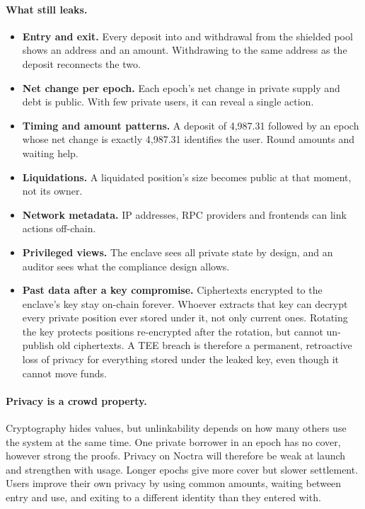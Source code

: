 \documentclass[11pt,a4paper]{article}
\begin{document}
\paragraph{What still leaks.}
\begin{itemize}
  \item \textbf{Entry and exit.} Every deposit into and withdrawal from the shielded pool shows an address and an
        amount. Withdrawing to the same address as the deposit reconnects the two.
  \item \textbf{Net change per epoch.} Each epoch's net change in private supply and debt is public. With few
        private users, it can reveal a single action.
  \item \textbf{Timing and amount patterns.} A deposit of 4,987.31 followed by an epoch whose net change is
        exactly 4,987.31 identifies the user. Round amounts and waiting help.
  \item \textbf{Liquidations.} A liquidated position's size becomes public at that moment, not its owner.
  \item \textbf{Network metadata.} IP addresses, RPC providers and frontends can link actions off-chain.
  \item \textbf{Privileged views.} The enclave sees all private state by design, and an auditor sees what the
        compliance design allows.
  \item \textbf{Past data after a key compromise.} Ciphertexts encrypted to the enclave's key stay on-chain
        forever. Whoever extracts that key can decrypt every private position ever stored under it, not only
        current ones. Rotating the key protects positions re-encrypted after the rotation, but cannot un-publish
        old ciphertexts. A TEE breach is therefore a permanent, retroactive loss of privacy for everything
        stored under the leaked key, even though it cannot move funds.
\end{itemize}

\paragraph{Privacy is a crowd property.} Cryptography hides values, but unlinkability depends on how many others use the system at the same time. One
private borrower in an epoch has no cover, however strong the proofs. Privacy on Noctra will therefore be weak at
launch and strengthen with usage. Longer epochs give more cover but slower settlement. Users improve their own
privacy by using common amounts, waiting between entry and use, and exiting to a different identity than they
entered with.
\end{document}

